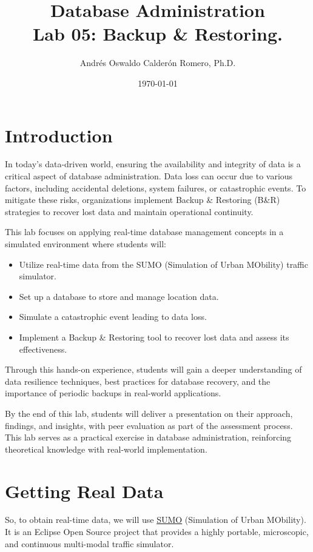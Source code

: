\documentclass{article}
\title{Database Administration \\ Lab 05: Backup \& Restoring.}
\author{Andrés Oswaldo Calderón Romero, Ph.D.}
\date{\today}
\begin{document}
\maketitle

\section{Introduction}

In today's data-driven world, ensuring the availability and integrity of data is a critical aspect of database administration. Data loss can occur due to various factors, including accidental deletions, system failures, or catastrophic events. To mitigate these risks, organizations implement Backup \& Restoring (B\&R) strategies to recover lost data and maintain operational continuity.

This lab focuses on applying real-time database management concepts in a simulated environment where students will:
\begin{itemize}
    \item Utilize real-time data from the SUMO (Simulation of Urban MObility) traffic simulator.
    \item Set up a database to store and manage location data.
    \item Simulate a catastrophic event leading to data loss.
    \item Implement a Backup \& Restoring tool to recover lost data and assess its effectiveness.
\end{itemize}

Through this hands-on experience, students will gain a deeper understanding of data resilience techniques, best practices for database recovery, and the importance of periodic backups in real-world applications.

By the end of this lab, students will deliver a presentation on their approach, findings, and insights, with peer evaluation as part of the assessment process.  This lab serves as a practical exercise in database administration, reinforcing theoretical knowledge with real-world implementation.

\section{Getting Real Data}
So, to obtain real-time data, we will use \href{https://eclipse.dev/sumo/}{SUMO} (Simulation of Urban MObility). It is an Eclipse Open Source project that provides a highly portable, microscopic, and continuous multi-modal traffic simulator.
\end{document}
